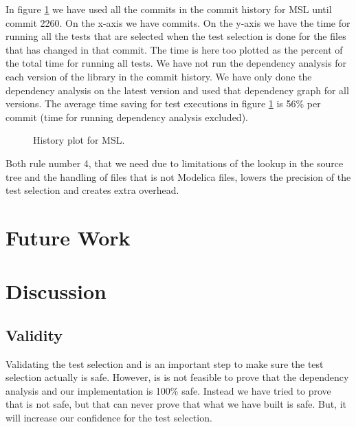 \documentclass{cslthse-msc}
\begin{document}
In figure \ref{fig:mslhistory} we have used all the commits in the commit history for MSL until commit 2260. On the x-axis we have commits. On the y-axis we have the time for running all the tests that are selected when the test selection is done for the files that has changed in that commit. The time is here too plotted as the percent of the total time for running all tests. We have not run the dependency analysis for each version of the library in the commit history. We have only done the dependency analysis on the latest version and used that dependency graph for all versions. The average time saving for test executions in figure \ref{fig:mslhistory} is 56\% per commit (time for running dependency analysis excluded).

\begin{figure}
    \centering
    \caption{History plot for MSL.}
    \label{fig:mslhistory}
\end{figure}
 
 Both rule number 4, that we need due to limitations of the lookup in the source tree and the handling of files that is not Modelica files, lowers the precision of the test selection and creates extra overhead.

\chapter[Future Work]{Future Work}
	
\chapter[Discussion]{Discussion}

\section{Validity}
Validating the test selection and is an important step to make sure the test selection actually is safe. 
However, is is not feasible to prove that the dependency analysis and our implementation is 100\% safe. Instead we have tried to prove that is not safe, but that can never prove that what we have built is safe. But, it will increase our confidence for the test selection. 
\end{document}
